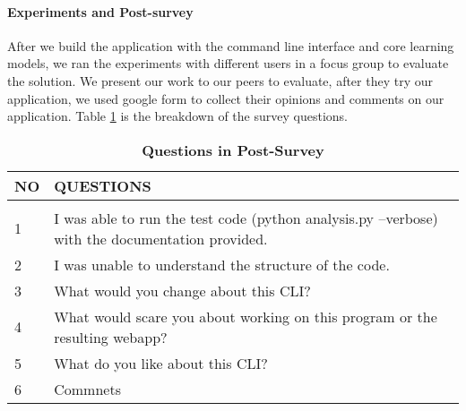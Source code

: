 \paragraph{Experiments and Post-survey}
After we build the application with the command line interface and core learning models, we ran the experiments with different users in a focus group to evaluate the solution. We present our work to our peers to evaluate, after they try our application, we used google form to collect their opinions and comments on our application. Table \ref{post-survey} is the breakdown of the survey questions.
\begin{table}[!htbp]
\caption{\bf Questions in Post-Survey} 
\label{post-survey}
\begin{center}
\begin{tabular}{  l  p{6cm} }
\bf NO & \bf QUESTIONS\\ \hline \\
1 & I was able to run the test code (python analysis.py --verbose) with the documentation provided.\\
2 & I was unable to understand the structure of the code.\\
3 & What would you change about this CLI?\\
4 & What would scare you about working on this program or the resulting webapp?\\
5 & What do you like about this CLI? \\
6 & Commnets
\end{tabular} 
\end{center}
\end{table}

